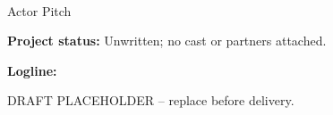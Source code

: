 \documentclass[11pt,letterpaper]{article}
\begin{document}
\begin{center}
{\Large\bfseries\sffamily \filmtitleupper}\\[6pt]
Actor Pitch
\end{center}
\textbf{Project status:} Unwritten; no cast or partners attached.

\textbf{Logline:} \filmlogline

DRAFT PLACEHOLDER -- replace before delivery.
\end{document}
